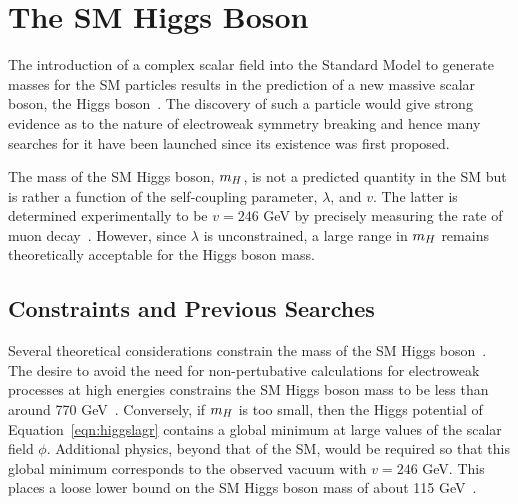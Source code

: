 \section{The SM Higgs Boson}
\label{sec:smhiggs}

The introduction of a complex scalar field into the Standard Model 
to generate masses for the SM particles results in the prediction 
of a new massive scalar boson, 
the Higgs boson~\citep{Higgs:1964ia,PhysRev.155.1554,Higgs:1964pj,Guralnik:1964eu,PhysRev.145.1156}. 
The discovery of such a particle would give strong evidence as to the 
nature of electroweak symmetry breaking and hence many searches for it have been
launched since its existence was first proposed.

The mass of the SM Higgs boson, $m_{H}$, is not a predicted quantity in the SM
but is rather a function of the self-coupling parameter, $\lambda$, and 
$v$. The latter is determined experimentally to be $v=246$ GeV by precisely 
measuring the rate of muon decay~\citep{muondecay}.
However, since $\lambda$ is unconstrained, a large range in $m_{H}$ remains 
theoretically acceptable for the Higgs boson mass.

\subsection{Constraints and Previous Searches}

Several theoretical considerations constrain the mass of the SM Higgs 
boson~\citep{ellisHiggsReview}.
The desire to avoid the need for non-pertubative calculations for electroweak 
processes at high energies constrains the SM
Higgs boson mass to be less than around 770 GeV~\citep{higgstriviality}. 
Conversely, if $m_{H}$ is too small,
then the Higgs potential of Equation~\ref{eqn:higgslagr} contains a  
global minimum at large values of the scalar field $\phi$. Additional
physics, beyond that of the SM, would be required so that this global minimum
corresponds to the observed vacuum with $v=246$ GeV. 
This places a loose lower bound on the SM Higgs boson mass of about 115 
GeV~\cite{higgsreview2012}. 

